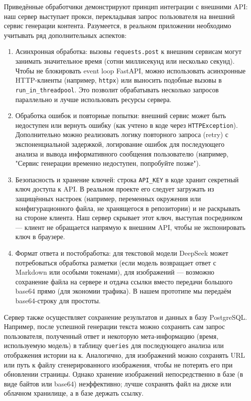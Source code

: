 Приведённые обработчики демонстрируют принцип интеграции с внешними API: наш сервер выступает прокси, перекладывая запрос пользователя на внешний сервис генерации контента. Разумеется, в реальном приложении необходимо учитывать ряд дополнительных аспектов:
\begin{enumerate}[label=\arabic*]
\item Асинхронная обработка: вызовы \verb|requests.post| к внешним сервисам могут занимать значительное время (сотни миллисекунд или несколько секунд). Чтобы не блокировать event loop FastAPI, можно использовать асинхронные HTTP-клиенты (например, \verb|httpx|) или выносить подобные вызовы в \verb|run_in_threadpool|. Это позволит обрабатывать несколько запросов параллельно и лучше использовать ресурсы сервера.
\item Обработка ошибок и повторные попытки: внешний сервис может быть недоступен или вернуть ошибку (как учтено в коде через \verb|HTTPException|). Дополнительно можно реализовать логику повторного запроса (retry) с экспоненциальной задержкой, логирование ошибок для последующего анализа и вывода информативного сообщения пользователю (например, "Сервис генерации временно недоступен, попробуйте позже").
\item Безопасность и хранение ключей: строка \verb|API_KEY| в коде хранит секретный ключ доступа к API. В реальном проекте его следует загружать из защищённых настроек (например, переменных окружения или конфигурационного файла, не хранящегося в репозитории) и не раскрывать на стороне клиента. Наш сервер скрывает этот ключ, выступая посредником — клиент не обращается напрямую к внешним API, чтобы не экспонировать ключ в браузере.
\item Формат ответа и постобработка: для текстовой модели DeepSeek может потребоваться обработка разметки (если модель возвращает ответ с Markdown или особыми токенами), для изображений — возможно сохранение файла на сервере и отдача ссылки вместо передачи большого base64 прямо (для экономии трафика). В нашем прототипе мы передаём base64-строку для простоты.
\end{enumerate}

Сервер также осуществляет сохранение результатов и данных в базу PostgreSQL. Например, после успешной генерации текста можно сохранить сам запрос пользователя, полученный ответ и некоторую мета-информацию (время, используемую модель) в таблицу \verb|queries| для последующего анализа или отображения истории на к. Аналогично, для изображений можно сохранять URL или путь к файлу сгенерированного изображения, чтобы не потерять его при обновлении страницы. Однако хранение изображений непосредственно в базе (в виде байтов или base64) неэффективно; лучше сохранять файл на диске или облачном хранилище, а в базе держать ссылку.

